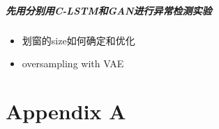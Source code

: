 \paragraph{先用分别用C-LSTM和GAN进行异常检测实验}
\begin{itemize}
    \item 划窗的size如何确定和优化
    \item oversampling with VAE
\end{itemize}



\chapter{Appendix A}
\listoffigures

